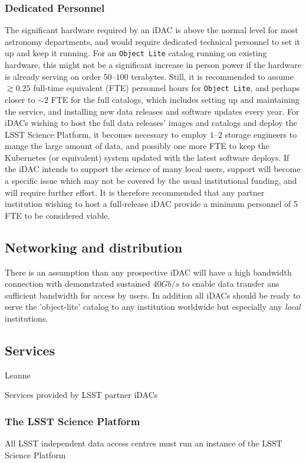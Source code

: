 \subsubsection{Dedicated Personnel}
The significant hardware required by an iDAC is above the normal level for most astronomy departments, and would require dedicated technical personnel to set it up and keep it running. For an {\tt Object Lite} catalog running on existing hardware, this might not be a significant increase in person power if the hardware is already serving on order $50$--$100$ terabytes. Still, it is recommended to assume $\gtrsim0.25$ full-time equivalent (FTE) personnel hours for {\tt Object Lite}, and perhaps closer to $\sim2$ FTE for the full catalogs, which includes setting up and maintaining the service, and installing new data releases and software updates every year. For iDACs wishing to host the full data releases' images and catalogs and deploy the LSST Science Platform, it becomes necessary to employ $1$--$2$ storage engineers to mange the large amount of data, and possibly one more FTE to keep the Kubernetes (or equivalent) system updated with the latest software deploys. If the iDAC intends to support the science of many local users, support will become a specific issue which may not be covered by the usual institutional funding, and will require further effort. It is therefore recommended that any partner institution wishing to host a full-release iDAC provide a minimum personnel of 5 FTE to be considered viable.

\subsection{Networking and distribution}
There is an assumption than any prospective iDAC will have a high bandwidth connection with demonstrated sustained $40 Gb/s$ to enable data transfer ans sufficient bandwidth for access by users.
In addition all iDACs should be ready  to serve the 'object-lite' catalog to any institution worldwide but especially any {\em local} institutions.

\subsection{Services}
{\color{red} Leanne } \newline

Services provided by LSST partner iDACs

\subsubsection{The LSST Science Platform}
All LSST independent data access centres must run an instance of the LSST Science Platform

